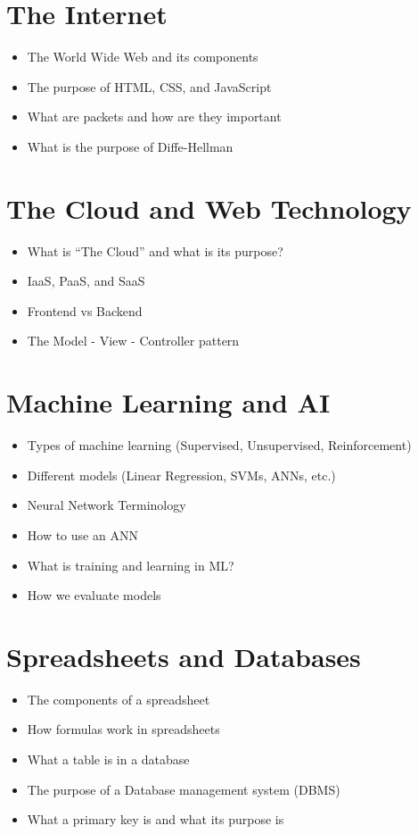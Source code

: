 \documentclass{article}
\begin{document}
\section*{The Internet}
\begin{itemize}
    \item The World Wide Web and its components
    \item The purpose of HTML, CSS, and JavaScript 
    \item What are packets and how are they important
    \item What is the purpose of Diffe-Hellman
\end{itemize}

\section*{The Cloud and Web Technology}
\begin{itemize}
    \item What is ``The Cloud'' and what is its purpose?
    \item IaaS, PaaS, and SaaS
    \item Frontend vs Backend
    \item The Model - View - Controller pattern
\end{itemize}

\newpage
\section*{Machine Learning and AI}
\begin{itemize}
    \item Types of machine learning (Supervised, Unsupervised, Reinforcement)
    \item Different models (Linear Regression, SVMs, ANNs, etc.)
    \item Neural Network Terminology
    \item How to use an ANN
    \item What is training and learning in ML?
    \item How we evaluate models
\end{itemize}

\section*{Spreadsheets and Databases}
\begin{itemize}
    \item The components of a spreadsheet
    \item How formulas work in spreadsheets
    \item What a table is in a database
    \item The purpose of a Database management system (DBMS)
    \item What a primary key is and what its purpose is
\end{itemize}
\end{document}
